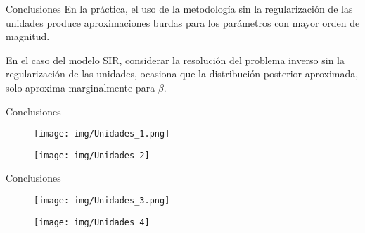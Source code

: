 \documentclass[10pt,aspectratio=169]{beamer}
\begin{document}
\begin{frame}{Conclusiones}
  En la práctica, el uso de la metodología sin la regularización de las unidades produce aproximaciones burdas para los parámetros con mayor orden de magnitud.

  \vspace{0.5 cm}

  En el caso del modelo SIR, considerar la resolución del problema inverso sin la regularización de las unidades, ocasiona que la distribución posterior aproximada, solo aproxima marginalmente para $\beta$.
\end{frame}


\begin{frame}{Conclusiones}
  \begin{figure}[H] 
    \centering 
    \texttt{[image: img/Unidades\_1.png]} 
  \end{figure} 
  \begin{figure}[H] 
    \centering 
    \texttt{[image: img/Unidades\_2]} 
    \label{Fig. Regulacion_1}
  \end{figure} 
\end{frame}

\begin{frame}{Conclusiones}
  \begin{figure}[H] 
    \centering 
    \texttt{[image: img/Unidades\_3.png]} 
  \end{figure} 
  \begin{figure}[H] 
    \centering 
    \texttt{[image: img/Unidades\_4]} 
    \label{Fig. Regulacion_2}
  \end{figure} 
\end{frame}
\end{document}
